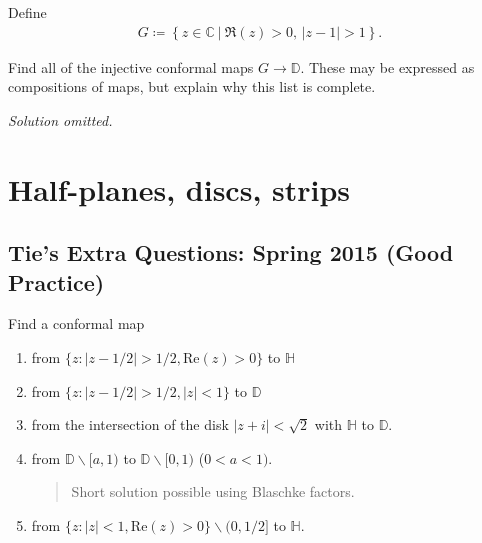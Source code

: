 \begin{problem}[?]

Define
\begin{align*}  
G \coloneqq\left\{{z\in {\mathbb{C}}{~\mathrel{\Big\vert}~}\Re(z) > 0, \, {\left\lvert {z-1} \right\rvert} > 1}\right\}
.\end{align*}

Find all of the injective conformal maps \(G\to {\mathbb{D}}\). These
may be expressed as compositions of maps, but explain why this list is
complete.

\end{problem}

\emph{Solution omitted.}

\hypertarget{half-planes-discs-strips}{%
\section{Half-planes, discs, strips}\label{half-planes-discs-strips}}

\hypertarget{ties-extra-questions-spring-2015-good-practice}{%
\subsection{Tie's Extra Questions: Spring 2015 (Good
Practice)}\label{ties-extra-questions-spring-2015-good-practice}}

\begin{problem}[?]

Find a conformal map

\begin{enumerate}
\def\labelenumi{\arabic{enumi}.}
\item
  from \(\{ z: |z - 1/2| > 1/2, \text{Re}(z)>0 \}\) to \(\mathbb H\)
\item
  from \(\{ z: |z - 1/2| > 1/2, |z| <1 \}\) to \(\mathbb D\)
\item
  from the intersection of the disk \(|z + i| < \sqrt{2}\) with
  \({\mathbb H}\) to \({\mathbb D}\).
\item
  from \({\mathbb D} \backslash [a, 1)\) to
  \({\mathbb D} \backslash [0, 1)\) (\(0<a<1)\).

  \begin{quote}
  Short solution possible using Blaschke factors.
  \end{quote}
\item
  from \(\{ z: |z| < 1, \text{Re}(z) > 0 \} \backslash (0, 1/2]\) to
  \(\mathbb H\).
\end{enumerate}

\end{problem}

